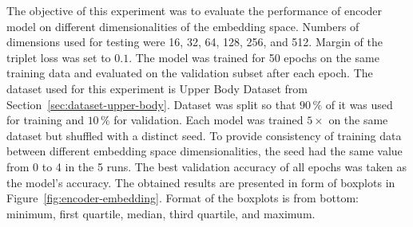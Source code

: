 The objective of this experiment was to evaluate the performance of encoder model on different dimensionalities of the embedding space. Numbers of dimensions used for testing were 16, 32, 64, 128, 256, and 512. Margin of the triplet loss was set to $0.1$. The model was trained for 50 epochs on the same training data and evaluated on the validation subset after each epoch. The dataset used for this experiment is Upper Body Dataset from Section~\ref{sec:dataset-upper-body}. Dataset was split so that $90\,\%$ of it was used for training and $10\,\%$ for validation. Each model was trained $5 \times$ on the same dataset but shuffled with a distinct seed. To provide consistency of training data between different embedding space dimensionalities, the seed had the same value from 0 to 4 in the 5 runs. The best validation accuracy of all epochs was taken as the model's accuracy. The obtained results are presented in form of boxplots in Figure~\ref{fig:encoder-embedding}. Format of the boxplots is from bottom: minimum, first quartile, median, third quartile, and maximum.


